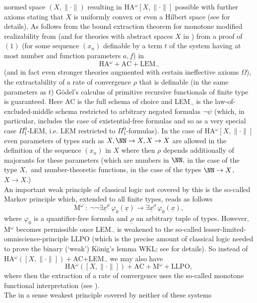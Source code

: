normed space $(X,\|\cdot\|)$ resulting 
in HA$^{\omega}[X,\|\cdot\|]$ possible with further axioms stating that 
$X$ is uniformly convex or even a Hilbert space (see \cite{Kohlenbach08} 
for details). 
As follows from the bound extraction theorem for monotone modified 
realizability from \cite{Kohlenbach08} (and for theories with 
abstract spaces $X$ in \cite{GerKoh06}) from a proof of $(1)$ (for 
some sequence $(x_n)$ definable by a term $t$ of the system having at most 
number and function parameters $a,f$) in 
\[ \mbox{HA$^{\omega} +$AC$+$LEM}_{\neg} \] 
(and in fact even stronger theories augmented with certain ineffective 
axioms $\Omega$), the extractability of a rate of convergence $\rho$ that 
is definable (in the same parameters as $t$) 
G\"odel's calculus of primitive recursive functionals of 
finite type is guaranteed.  Here AC is the full schema of choice and 
LEM$_{\neg}$ is the law-of-excluded-middle schema restricted to arbitrary 
negated formulas $\neg\psi$ (which, in particular, includes the case 
of existential-free formulas and so as a very special case $\Pi^0_1$-LEM, 
i.e. LEM restricted to $\Pi^0_1$-formulas). In the case of 
HA$^{\omega}[X,\| \cdot\|]$ even parameters of types such as $X, \NN\to X, 
X\to X$ are allowed in the definition of the sequence $(x_n)$ in $X$ where 
then $\rho$ depends additionally of majorants for these parameters (which are 
numbers in $\NN,$ in the case of the type $X,$ and number-theoretic 
functions, in the case of the types $\NN\to X$, $X\to X.$) \\[2mm] 
An important weak principle of classical logic not covered by this is 
the so-called Markov principle which, extended to all finite types, reads 
as follows 
\[ \mbox{M}^{\omega}\ :\ 
\neg\neg\exists \underline{x}^{\underline{\rho}} \ \varphi_0(\underline{x})\to 
\exists \underline{x}^{\underline{\rho}}\,\varphi_0(\underline{x}), \] 
where $\varphi_0$ is a quantifier-free formula and $\underline{\rho}$ an 
arbitrary tuple of types. However, M$^{\omega}$ becomes permissible once 
LEM$_{\neg}$ is weakened to the so-called lesser-limited-omniscience-principle 
LLPO (which is the precise amount of classical logic needed to prove the 
binary (`weak') K\"onig's lemma WKL; see \cite{Kohlenbach08} for details).
So instead of HA$^{\omega}([X,\|\cdot\|])+$AC$+$LEM$_{\neg}$ we may also have 
\[ \mbox{HA$^{\omega}([X,\|\cdot \| ])+$AC$+$M$^{\omega}+$LLPO}, \] 
where then the extraction of a rate of convergence uses the so-called 
monotone functional interpretation (see \cite{Kohlenbach08}).
\\[2mm] The in a sense weakest principle covered by neither of these systems 
